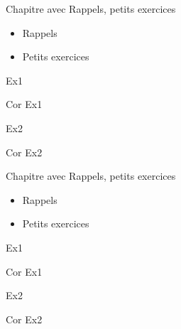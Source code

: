 \documentclass[nocrop]{sesamanuel}
\begin{document}
\begin{prerequis}[Prérequis - G1]
  Chapitre avec Rappels, petits exercices  
  \begin{itemize}
  \item Rappels
  \item Petits exercices
  \end{itemize}
\end{prerequis}

\begin{autoeval}  
    \begin{exercice}
      Ex1
    \end{exercice}
    \begin{corrige}
      Cor Ex1
    \end{corrige}
    \begin{exercice}
      Ex2
    \end{exercice}
    \begin{corrige}
      Cor Ex2
    \end{corrige}
\end{autoeval}


\begin{prerequis}[Prérequis - G1]
  Chapitre avec Rappels, petits exercices  
  \begin{itemize}
  \item Rappels
  \item Petits exercices
  \end{itemize}
\end{prerequis}

\begin{autoeval}  
    \begin{exercice}
      Ex1
    \end{exercice}
    \begin{corrige}
      Cor Ex1
    \end{corrige}
    \begin{exercice}
      Ex2
    \end{exercice}
    \begin{corrige}
      Cor Ex2
    \end{corrige}
\end{autoeval}

\end{document}
